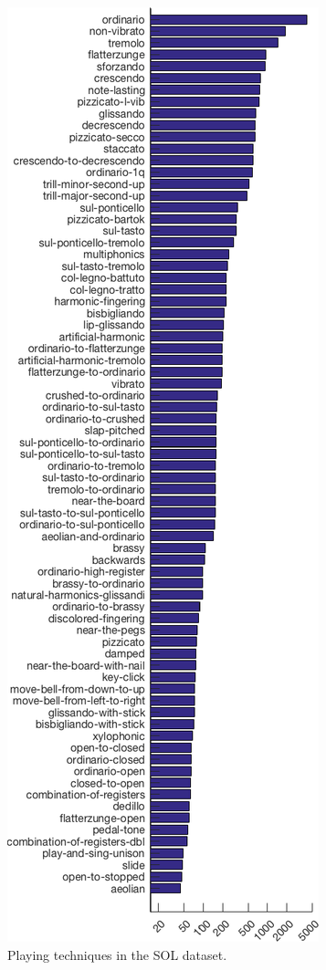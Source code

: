 \documentclass{article}
\begin{document}
\begin{figure}[h!]
\centering
\includegraphics[width=0.96\linewidth]{./figs/histogram/histogram_modes.png}
\caption{Playing techniques in the SOL dataset.}
\label{fig:instrument-dendrogram}
\end{figure}
\end{document}
